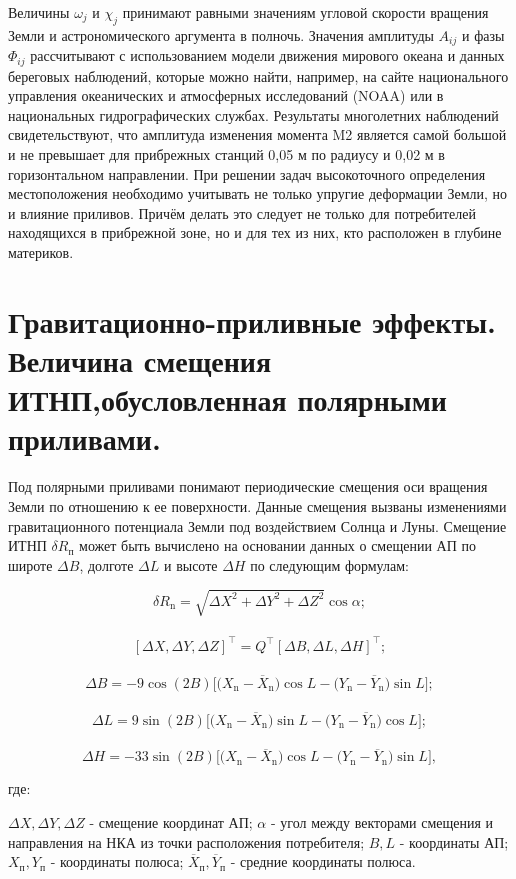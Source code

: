 \documentclass[14pt,a4paper,oneside]{extarticle}
\begin{document}
Величины $\omega_{j}$ и $\chi_{j}$ принимают равными значениям угловой скорости вращения Земли и астрономического аргумента в полночь.
Значения амплитуды $A_{ij}$ и фазы $\Phi_{ij}$ рассчитывают с использованием модели движения мирового океана и данных береговых наблюдений, которые можно найти, например, на сайте национального управления океанических и атмосферных исследований (NOAA) или в национальных гидрографических службах. 
Результаты многолетних наблюдений свидетельствуют, что амплитуда изменения момента M2 является самой большой и не превышает для прибрежных станций 0,05 м по радиусу и 0,02 м в горизонтальном направлении. 
При решении задач высокоточного определения местоположения необходимо учитывать не только упругие деформации Земли, но и влияние приливов. 
Причём делать это следует не только для потребителей находящихся в прибрежной зоне, но и для тех из них, кто расположен в глубине материков.

\section{Гравитационно-приливные эффекты. Величина смещения ИТНП,обусловленная полярными приливами.}

Под полярными приливами понимают периодические смещения оси вращения Земли по отношению к ее поверхности. 
Данные смещения вызваны изменениями гравитационного потенциала Земли под воздействием Солнца и Луны. 
Смещение ИТНП $\delta R_\text{п}$ может быть вычислено на основании данных о смещении АП по широте $\Delta B$, долготе $\Delta L$ и высоте $\Delta H$ по следующим формулам:

\[\delta R_{\mathrm{n}}=\sqrt{\Delta X^{2}+\Delta Y^{2}+\Delta Z^{2}}\cos\alpha;\] \\
\[[\Delta X,\Delta Y,\Delta Z]^{\intercal}=Q^{\intercal}[\Delta B,\Delta L,\Delta H]^{\intercal};\] \\
\[\Delta B=-9\cos(2B)\big[\big(X_{\mathrm{n}}-\overline{X}_{\mathrm{n}}\big)\cos L-\big(Y_{\mathrm{n}}-\overline{Y}_{\mathrm{n}}\big)\sin L\big]; \] \\
\[\Delta L=9\sin(2B)\big[\big(X_\mathrm{n}-\overline{X}_\mathrm{n}\big)\sin L-\big(Y_\mathrm{n}-\overline{Y}_\mathrm{n}\big)\cos L\big]; \] \\
\[\Delta H=-33\sin(2B)\big[\big(X_{\mathrm{n}}-\overline{X}_{\mathrm{n}}\big)\cos L-\big(Y_{\mathrm{n}}-\overline{Y}_{\mathrm{n}}\big)\sin L\big], \]

где:

$\Delta X, \Delta Y, \Delta Z$ - смещение координат АП;
$\alpha$ - угол между векторами смещения и направления на НКА из точки расположения потребителя; 
$B, L$ - координаты АП;
$X_\text{п}, Y_\text{п}$ - координаты полюса;
$\overline{X}_\text{п}, \overline{Y}_\text{п}$ - средние координаты полюса.
\end{document}

